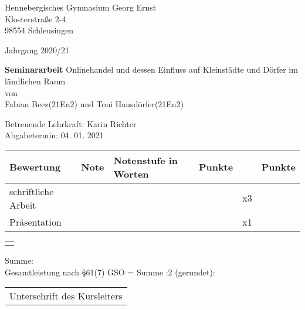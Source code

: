 \begin{titlepage}
    
    \raggedright
        Hennebergisches Gymnasium Georg Ernst\\
        Klosterstraße 2-4\\
        98554 Schleusingen
        
    \raggedleft\vspace*{-1.9cm}
        Jahrgang 2020/21
            \vfill\vfill\vfill\vfill\vfill\vfill

    \centering
        \LARGE\textbf{Seminararbeit} %
            \vfill
        \large Onlinehandel und dessen Einfluss auf Kleinstädte und Dörfer im ländlichen Raum\\[\baselineskip]
        von\\
        Fabian Beez(21En2) und Toni Hausdörfer(21En2)
            \vfill\vfill\vfill\vfill

    \raggedright
        Betreuende Lehrkraft: \hfill Karin Richter\\
        Abgabetermin: \hfill 04. 01. 2021\\[\baselineskip]
        \begin{tabular}[h]{|l|l|l|l|l|l|}
            \hline
            Bewertung & Note & Notenstufe in Worten & Punkte &  & Punkte \\
            \hline
            schriftliche Arbeit & & & & x3 & \\
            \hline
            Präsentation & & & & x1 & \\
            \hline
        \end{tabular}

    \raggedleft\vspace*{-0.05cm}
        \begin{tabular}[h]{|p{1.56cm}|}
            \hline
            \\
            \hline
            \\
            \hline
        \end{tabular}

    \raggedright\vspace*{-1.4cm}
        \hspace*{0.2cm}Summe: \hfill\\
        \hspace*{0.2cm}Gesamtleistung nach §61(7) GSO = Summe :2 (gerundet): \hfill\\[\baselineskip]
            \vfill\vfill\vfill
        
    \raggedleft
        \begin{tabular}{@{}l@{}}\hline
            Unterschrift des Kursleiters
        \end{tabular}
            \vfill\vfill
\end{titlepage}

\newpage

